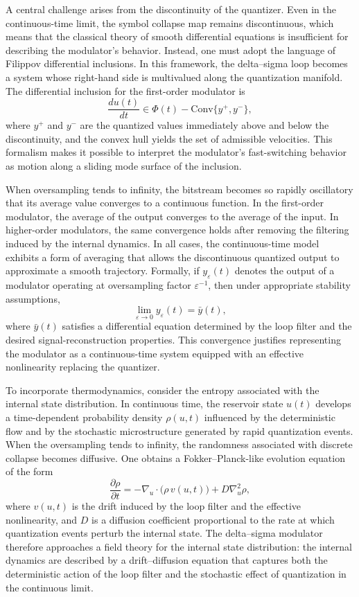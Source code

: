 A central challenge arises from the discontinuity of the quantizer. Even in the continuous-time limit, the symbol collapse map remains discontinuous, which means that the classical theory of smooth differential equations is insufficient for describing the modulator’s behavior. Instead, one must adopt the language of Filippov differential inclusions. In this framework, the delta–sigma loop becomes a system whose right-hand side is multivalued along the quantization manifold. The differential inclusion for the first-order modulator is
\[
\frac{d u(t)}{dt} \in \Phi(t) - \mathrm{Conv}\{y^+, y^-\},
\]
where \(y^+\) and \(y^-\) are the quantized values immediately above and below the discontinuity, and the convex hull yields the set of admissible velocities. This formalism makes it possible to interpret the modulator's fast-switching behavior as motion along a sliding mode surface of the inclusion.

When oversampling tends to infinity, the bitstream becomes so rapidly oscillatory that its average value converges to a continuous function. In the first-order modulator, the average of the output converges to the average of the input. In higher-order modulators, the same convergence holds after removing the filtering induced by the internal dynamics. In all cases, the continuous-time model exhibits a form of averaging that allows the discontinuous quantized output to approximate a smooth trajectory. Formally, if \(y_\varepsilon(t)\) denotes the output of a modulator operating at oversampling factor \(\varepsilon^{-1}\), then under appropriate stability assumptions,
\[
\lim_{\varepsilon \to 0} y_\varepsilon(t) = \bar{y}(t),
\]
where \(\bar{y}(t)\) satisfies a differential equation determined by the loop filter and the desired signal-reconstruction properties. This convergence justifies representing the modulator as a continuous-time system equipped with an effective nonlinearity replacing the quantizer.

To incorporate thermodynamics, consider the entropy associated with the internal state distribution. In continuous time, the reservoir state \(u(t)\) develops a time-dependent probability density \(\rho(u,t)\) influenced by the deterministic flow and by the stochastic microstructure generated by rapid quantization events. When the oversampling tends to infinity, the randomness associated with discrete collapse becomes diffusive. One obtains a Fokker–Planck-like evolution equation of the form
\[
\frac{\partial \rho}{\partial t} = - \nabla_u \cdot \big( \rho\, v(u,t) \big) + D \nabla_u^2 \rho,
\]
where \(v(u,t)\) is the drift induced by the loop filter and the effective nonlinearity, and \(D\) is a diffusion coefficient proportional to the rate at which quantization events perturb the internal state. The delta–sigma modulator therefore approaches a field theory for the internal state distribution: the internal dynamics are described by a drift–diffusion equation that captures both the deterministic action of the loop filter and the stochastic effect of quantization in the continuous limit.

